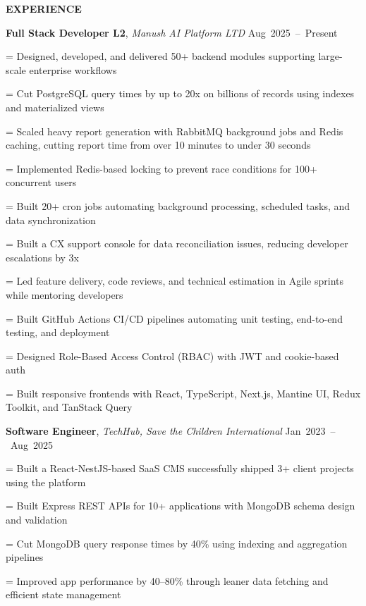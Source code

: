 \documentclass[a4paper]{article}
\newcommand{\sectionfont}{%
  \fontsize{12pt}{14pt}\selectfont\bfseries
}
\newlength{\listindent}
\newcommand{\sectiontitle}[1]{%
  \par
  \vspace{14pt}
  {\sectionfont #1}\par
  \vspace{6pt}
}
\newlength{\bulletgap}
\newcommand{\resumebullet}[1]{%
  \begingroup
  \leftskip=\listindent
  \parindent=0pt
  \noindent
  \llap{%
    \raisebox{0.15ex}{%
      \fontsize{7}{7}\selectfont -
    }%
    \hspace{6pt}%
  }%
  #1\par
  \endgroup
  \vspace{\bulletgap}%
}
\newcommand{\experienceheader}[3]{%
  \noindent
  \textbf{#1}, \textit{#2}%
  \hfill
  \mbox{#3}%
  \par
  \vspace{1pt}
}
\begin{document}
\sectiontitle{EXPERIENCE}

\experienceheader
{Full Stack Developer L2}
{Manush AI Platform LTD}
{Aug 2025 -- Present}

\resumebullet{Designed, developed, and delivered 50+ backend modules supporting large-scale enterprise workflows}

\resumebullet{Cut PostgreSQL query times by up to 20x on billions of records using indexes and materialized views}

\resumebullet{Scaled heavy report generation with RabbitMQ background jobs and Redis caching, cutting report time from over 10 minutes to under 30 seconds}



\resumebullet{Implemented Redis-based locking to prevent race conditions for 100+ concurrent users}

\resumebullet{Built 20+ cron jobs automating background processing, scheduled tasks, and data synchronization}

\resumebullet{Built a CX support console for data reconciliation issues, reducing developer escalations by 3x}

\resumebullet{Led feature delivery, code reviews, and technical estimation in Agile sprints while mentoring developers}

\resumebullet{Built GitHub Actions CI/CD pipelines automating unit testing, end-to-end testing, and deployment}

\resumebullet{Designed Role-Based Access Control (RBAC) with JWT and cookie-based auth}


\resumebullet{Built responsive frontends with React, TypeScript, Next.js, Mantine UI, Redux Toolkit, and TanStack Query}

\vspace{13pt}

\experienceheader
{Software Engineer}
{TechHub, Save the Children International}
{Jan 2023 -- Aug 2025}



\resumebullet{Built a React-NestJS-based SaaS CMS successfully shipped 3+ client projects using the platform}

\resumebullet{Built Express REST APIs for 10+ applications with MongoDB schema design and validation}

\resumebullet{Cut MongoDB query response times by 40\% using indexing and aggregation pipelines}

\resumebullet{Improved app performance by 40--80\% through leaner data fetching and efficient state management}
\end{document}
